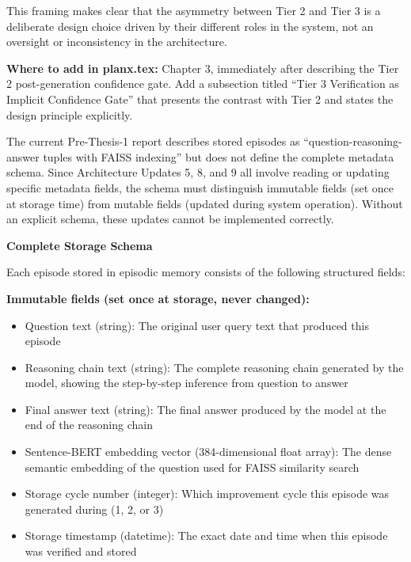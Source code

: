 \documentclass[11pt,a4paper]{article}
\newcommand{\architecturebox}[2]{%
\begin{tcolorbox}[enhanced,breakable,
  colback=LightTeal,colframe=Teal,boxrule=1.5pt,arc=4pt,
  left=8pt,right=8pt,top=6pt,bottom=6pt,
  title={\bfseries\small\color{white}#1},
  attach boxed title to top left={yshift=-2mm,xshift=6mm},
  boxed title style={colback=Teal,arc=3pt,boxrule=0pt,
    left=4pt,right=4pt,top=2pt,bottom=2pt}]
#2
\end{tcolorbox}}
\begin{document}
{This framing makes clear that the asymmetry between Tier 2 and Tier 3 is a deliberate design choice driven by their different roles in the system, not an oversight or inconsistency in the architecture.

\textbf{Where to add in planx.tex:} Chapter 3, immediately after describing the Tier 2 post-generation confidence gate. Add a subsection titled ``Tier 3 Verification as Implicit Confidence Gate'' that presents the contrast with Tier 2 and states the design principle explicitly.
}

\architecturebox{ARCHITECTURE UPDATE 7: Complete Episode Storage Schema Definition}{
The current Pre-Thesis-1 report describes stored episodes as ``question-reasoning-answer tuples with FAISS indexing'' but does not define the complete metadata schema. Since Architecture Updates 5, 8, and 9 all involve reading or updating specific metadata fields, the schema must distinguish immutable fields (set once at storage time) from mutable fields (updated during system operation). Without an explicit schema, these updates cannot be implemented correctly.

\textbf{Complete Storage Schema}

Each episode stored in episodic memory consists of the following structured fields:

\textbf{Immutable fields (set once at storage, never changed):}
\begin{itemize}
\item Question text (string): The original user query text that produced this episode
\item Reasoning chain text (string): The complete reasoning chain generated by the model, showing the step-by-step inference from question to answer
\item Final answer text (string): The final answer produced by the model at the end of the reasoning chain
\item Sentence-BERT embedding vector (384-dimensional float array): The dense semantic embedding of the question used for FAISS similarity search
\item Storage cycle number (integer): Which improvement cycle this episode was generated during (1, 2, or 3)
\item Storage timestamp (datetime): The exact date and time when this episode was verified and stored
\end{itemize}

}
\end{document}
